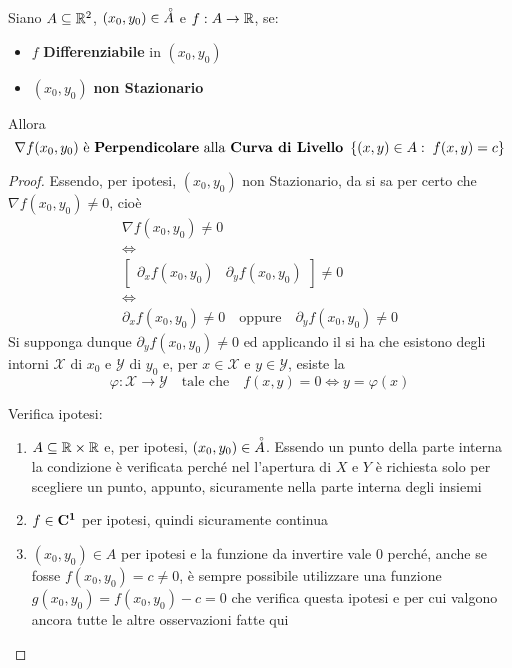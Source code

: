 \begin{proposition}
	\label{prop:curv_liv_perp_grad}
	Siano $A \subseteq \mathbb{R}^2$, $(x_0, y_0) \in \accentset{\circ}{A}$ e $f: A \to \mathbb{R}$, se:
	\begin{itemize}[noitemsep]
		\item $f$ \textbf{Differenziabile} in $(x_0, y_0)$
		\item $(x_0, y_0)$ \textbf{non Stazionario}
	\end{itemize}
	Allora
	\[\nabla f(x_0, y_0) \text{ è \textbf{Perpendicolare} alla \textbf{Curva di Livello} } \left\{(x,y) \in A:\; f(x,y) = c\right\}\]
	\begin{proof}
		Essendo, per ipotesi, $(x_0, y_0)$ non Stazionario, da  si sa per certo che $\nabla f(x_0, y_0) \neq 0$, cioè
		\begin{gather*}
			\nabla f(x_0, y_0) \neq 0\\
			\iff\\
			\begin{bmatrix}
				\partial_x f(x_0, y_0) & \partial_y f(x_0, y_0)
			\end{bmatrix}
			\neq 0\\
			\iff\\
			\partial_x f(x_0, y_0) \neq 0 \quad \text{oppure} \quad \partial_y f(x_0, y_0) \neq 0
		\end{gather*}
		Si supponga dunque $\partial_y f(x_0,y_0) \neq 0$ ed applicando il  si ha che esistono degli intorni $\mathcal{X}$ di $x_0$ e $\mathcal{Y}$ di $y_0$ e, per $x \in \mathcal{X}$ e $y \in \mathcal{Y}$, esiste la
		\[\varphi: \mathcal{X} \to \mathcal{Y} \quad \text{tale che} \quad f(x,y) = 0 \iff y = \varphi(x)\]
		\vspace*{-2\baselineskip}
		\begin{note}
			Verifica ipotesi:
			\begin{enumerate}
				\item $A \subseteq \mathbb{R} \times \mathbb{R}$ e, per ipotesi, $(x_0, y_0) \in \accentset{\circ}{A}$. Essendo un punto della parte interna la condizione è verificata perché nel  l'apertura di $X$ e $Y$ è richiesta solo per scegliere un punto, appunto, sicuramente nella parte interna degli insiemi
				\item $f \in \mathbf{C^{1}}$ per ipotesi, quindi sicuramente continua
				\item $(x_0, y_0) \in A$ per ipotesi e la funzione da invertire vale $0$ perché, anche se fosse $f(x_0, y_0) = c \neq 0$, è sempre possibile utilizzare una funzione $g(x_0, y_0) = f(x_0, y_0) - c = 0$ che verifica questa ipotesi e per cui valgono ancora tutte le altre osservazioni fatte qui

\end{enumerate}
\end{note}
\end{proof}
\end{proposition}
